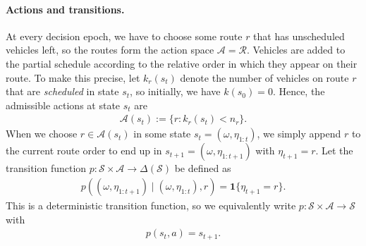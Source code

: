 \documentclass{report}
\theoremstyle{definition}
\theoremstyle{plain}
\begin{document}
\paragraph{Actions and transitions.}

At every decision epoch, we have to choose some route $r$ that has unscheduled
vehicles left, so the routes form the action space $\mathcal{A} = \mathcal{R}$.
%
Vehicles are added to the partial schedule according to the relative order in
which they appear on their route.
%
To make this precise, let $k_r(s_t)$ denote the number of vehicles on route $r$
that are \emph{scheduled} in state $s_t$, so initially, we have $k(s_0) = 0$.
%
Hence, the admissible actions at state $s_t$ are
\begin{align}
  \mathcal{A}(s_t) := \{ r: k_r(s_t) < n_r \} .
\end{align}
%
When we choose $r \in \mathcal{A}(s_t)$ in some state $s_t = (\omega, \eta_{1:t})$,
we simply append $r$ to the current route order to end up in $s_{t+1} = (\omega, \eta_{1:t+1})$ with $\eta_{t+1} = r$.
Let the transition function
$p : \mathcal{S} \times \mathcal{A} \rightarrow \Delta(\mathcal{S})$ be defined as
\begin{align}
  p((\omega, \eta_{1:t+1}) \mid (\omega, \eta_{1:t}), r) = \mathbf{1}\{ \eta_{t+1} = r \} .
\end{align}
%
This is a deterministic transition function, so we equivalently write
$p:\mathcal{S} \times \mathcal{A} \rightarrow \mathcal{S}$ with 
\begin{align}
  p(s_t, a) = s_{t+1} .
\end{align}


\end{document}
